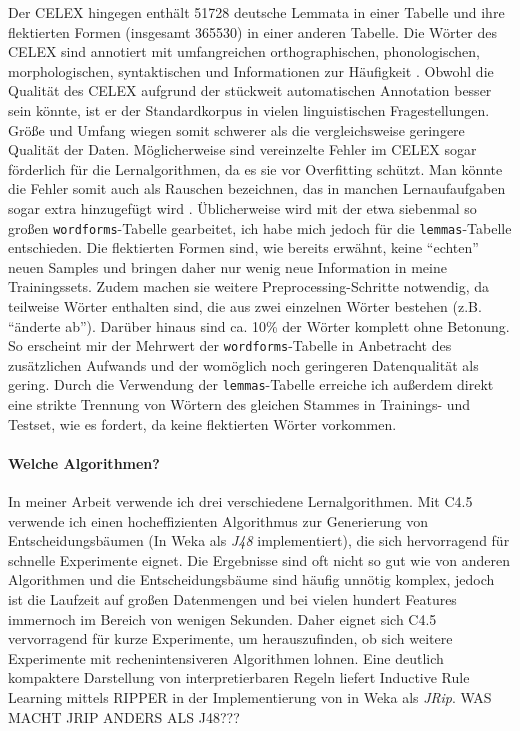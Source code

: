 Der CELEX \cite{Baayen&Piepenbrock&Gulikers1995} hingegen enthält 51728 deutsche Lemmata in einer Tabelle und ihre flektierten Formen (insgesamt 365530) in einer anderen Tabelle. Die Wörter des CELEX sind annotiert mit umfangreichen orthographischen, phonologischen, morphologischen, syntaktischen und Informationen zur Häufigkeit \cite{Gulikers&Rattnik&Piepenbrock}. Obwohl die Qualität des CELEX aufgrund der stückweit automatischen Annotation besser sein könnte, ist er der Standardkorpus in vielen linguistischen Fragestellungen. Größe und Umfang wiegen somit schwerer als die vergleichsweise geringere Qualität der Daten. Möglicherweise sind vereinzelte Fehler im CELEX sogar förderlich für die Lernalgorithmen, da es sie vor Overfitting schützt. Man könnte die Fehler somit auch als Rauschen bezeichnen, das in manchen Lernaufaufgaben sogar extra hinzugefügt wird \cite{???}. Üblicherweise wird mit der etwa siebenmal so großen \texttt{wordforms}-Tabelle gearbeitet, ich habe mich jedoch für die \texttt{lemmas}-Tabelle entschieden. Die flektierten Formen sind, wie bereits erwähnt, keine \enquote{echten} neuen Samples und bringen daher nur wenig neue Information in meine Trainingssets. Zudem machen sie weitere Preprocessing-Schritte notwendig, da teilweise Wörter enthalten sind, die aus zwei einzelnen Wörter bestehen (z.B. \enquote{änderte ab}). Darüber hinaus sind ca. 10\% der Wörter komplett ohne Betonung. So erscheint mir der Mehrwert der \texttt{wordforms}-Tabelle in Anbetracht des zusätzlichen Aufwands und der womöglich noch geringeren Datenqualität als gering. Durch die Verwendung der \texttt{lemmas}-Tabelle erreiche ich außerdem direkt eine strikte Trennung von Wörtern des gleichen Stammes in Trainings- und Testset, wie \cite{Demberg2006} es fordert, da keine flektierten Wörter vorkommen.

\paragraph*{Welche Algorithmen?}
In meiner Arbeit verwende ich drei verschiedene Lernalgorithmen. Mit C4.5 verwende ich einen hocheffizienten Algorithmus zur Generierung von Entscheidungsbäumen (In Weka als \textit{J48} \cite{???} implementiert), die sich hervorragend für schnelle Experimente eignet. Die Ergebnisse sind oft nicht so gut wie von anderen Algorithmen und die Entscheidungsbäume sind häufig unnötig komplex, jedoch ist die Laufzeit auf großen Datenmengen und bei vielen hundert Features immernoch im Bereich von wenigen Sekunden. Daher eignet sich C4.5 vervorragend für kurze Experimente, um herauszufinden, ob sich weitere Experimente mit rechenintensiveren Algorithmen lohnen.
Eine deutlich kompaktere Darstellung von interpretierbaren Regeln liefert Inductive Rule Learning mittels RIPPER \cite{???} in der Implementierung von \cite{???} in Weka als \textit{JRip}. WAS MACHT JRIP ANDERS ALS J48???

